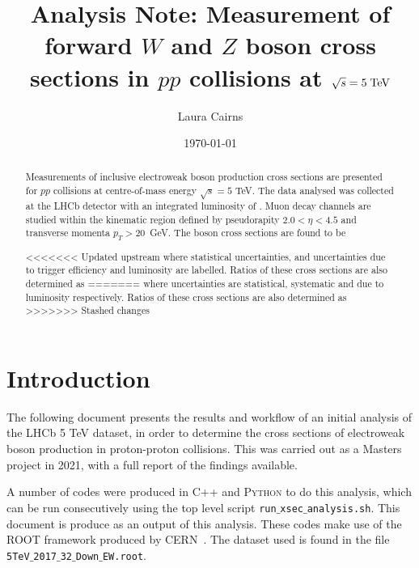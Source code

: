 \documentclass[a4paper,12pt]{article}
\title{Analysis Note: Measurement of forward $W$ and $Z$ boson cross sections in $pp$ collisions at $\sqrt{s}=5 \; \rm{TeV}$}
\author{Laura Cairns}
\date{\today}
\begin{document}
\maketitle

\begin{abstract}
    \noindent 
    Measurements of inclusive electroweak boson production cross sections are presented for $pp$ collisions at centre-of-mass energy $\sqrt{s} = 5$ TeV. The data analysed was collected at the LHCb detector with an integrated luminosity of . Muon decay channels are studied within the kinematic region defined by pseudorapity $2.0 < \eta < 4.5$ and transverse momenta $p_T > 20$~GeV. The boson cross sections are found to be
    
    
    
<<<<<<< Updated upstream
    where statistical uncertainties, and uncertainties due to trigger efficiency and luminosity are labelled. Ratios of these cross sections are also determined as 
=======
    where uncertainties are statistical, systematic and due to luminosity respectively. Ratios of these cross sections are also determined as 
>>>>>>> Stashed changes
    
    
\end{abstract}

\section{Introduction}
The following document presents the results and workflow of an initial analysis of the LHCb 5 TeV dataset, in order to determine the cross sections of electroweak boson production in proton-proton collisions. This was carried out as a Masters project in 2021, with a full report of the findings available.

A number of codes were produced in C++ and \textsc{Python} to do this analysis, which can be run consecutively using the top level script \texttt{run$\_$xsec$\_$analysis.sh}. This document is produce as an output of this analysis. These codes make use of the ROOT framework produced by CERN~\cite{ROOT}. The dataset used is found in the file \texttt{5TeV$\_$2017$\_$32$\_$Down$\_$EW.root}.

\end{document}
